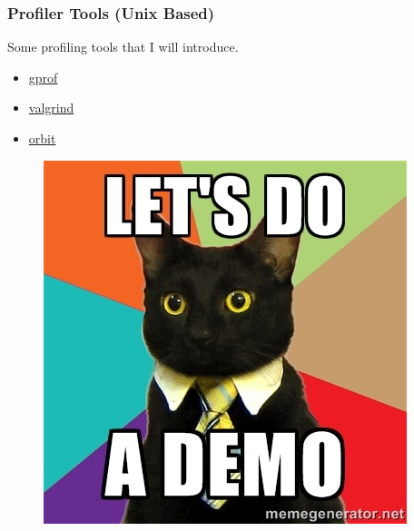 \documentclass{beamer}
\begin{document}
\begin{frame}
\frametitle{Profiler Tools (Unix Based)}
Some profiling tools that I will introduce.

 \begin{itemize}
     \setlength\itemsep{1em}
     \item \href{https://www.man7.org/linux/man-pages/man1/gprof.1.html}{gprof}
     \item \href{https://valgrind.org/}{valgrind}
     \item \href{https://orbitprofiler.com/}{orbit}
 \end{itemize}

\begin{figure}[r]
\centering
\pause \includegraphics[scale=0.25, right]{demo-time.jpeg}
\end{figure}

\end{frame}
\end{document}
